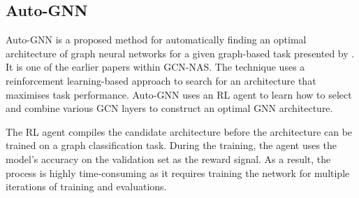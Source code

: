 \subsection{Auto-GNN}
\Gls{Auto-GNN} is a proposed method for automatically finding an optimal architecture of graph neural networks for a given graph-based task presented by \cite{zhou2019auto}. It is one of the earlier papers within \gls{GCN}-\gls{NAS}. The technique uses a reinforcement learning-based approach to search for an architecture that maximises task performance. \gls{Auto-GNN} uses an RL agent to learn how to select and combine various \gls{GCN} layers to construct an optimal \gls{GNN} architecture. 

The RL agent compiles the candidate architecture before the architecture can be trained on a graph classification task. During the training, the agent uses the model's accuracy on the validation set as the reward signal. As a result, the process is highly time-consuming as it requires training the network for multiple iterations of training and evaluations. 